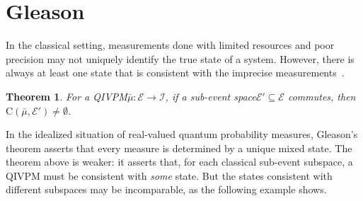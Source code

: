 \documentclass[english,reprint, aps, prl,superscriptaddress, showpacs,
showkeys, longbibliography, amsmath, amssymb]{revtex4-1}
\theoremstyle{plain}
\newtheorem{thm}{Theorem}
\theoremstyle{definition}
\newcommand{\events}{\ensuremath{\mathcal{E}}}
\newcommand{\coreBorn}{\ensuremath{\mathrm{C}}}
\newcommand{\nb}{\nolinebreak[1] }
\begin{document}
\section{Gleason}
  \label{sec:Gleason}
In the classical setting, measurements done with limited resources and
poor precision may not uniquely identify the true state of a
system. However, there is always at least one state that is consistent
with the imprecise
measurements~\cite{Shapley1971,GilboaSchmeidler1994,Grabisch2016}.

\begin{thm}\label{thm:Shapley}
  For a QIVPM\nb$\bar{\mu}:\events\rightarrow\mathscr{I}$, if a
  sub-event space\nb$\events'\subseteq\events$ commutes, then
  $\coreBorn\left(\bar{\mu},\events'\right)\ne\emptyset$.
\end{thm}

In the idealized situation of real-valued quantum probability
measures, Gleason's theorem asserts that every measure is determined
by a unique mixed state. The theorem above is weaker: it
asserts that, for each classical sub-event subspace, a QIVPM must be
consistent with \emph{some} state. But the states consistent with
different subspaces may be incomparable, as the following example
shows.
\end{document}
